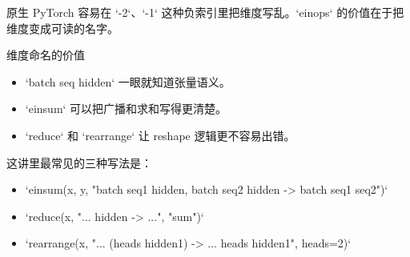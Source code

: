 原生 PyTorch 容易在 `-2`、`-1` 这种负索引里把维度写乱。`einops` 的价值在于把维度变成可读的名字。

\begin{knowledgebox}{维度命名的价值}
\begin{itemize}
    \item `batch seq hidden` 一眼就知道张量语义。
    \item `einsum` 可以把广播和求和写得更清楚。
    \item `reduce` 和 `rearrange` 让 reshape 逻辑更不容易出错。
\end{itemize}
\end{knowledgebox}

这讲里最常见的三种写法是：
\begin{itemize}
    \item `einsum(x, y, "batch seq1 hidden, batch seq2 hidden -> batch seq1 seq2")`
    \item `reduce(x, "... hidden -> ...", "sum")`
    \item `rearrange(x, "... (heads hidden1) -> ... heads hidden1", heads=2)`
\end{itemize}

